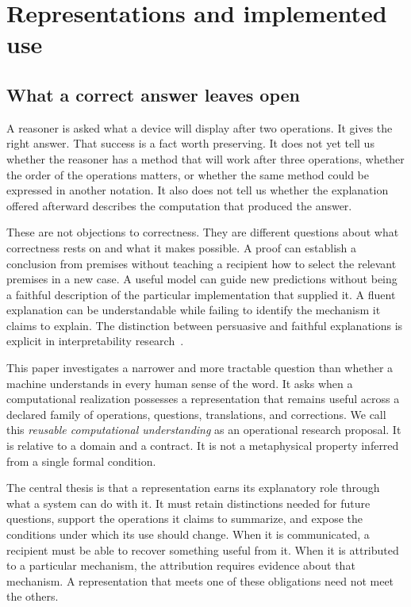 
\chapter{Representations and implemented use}\label{MU:book:chapter-46}


\section{What a correct answer leaves open}\label{MU:sec:intro}
A reasoner is asked what a device will display after two operations. It gives the right answer. That success is a fact worth preserving. It does not yet tell us whether the reasoner has a method that will work after three operations, whether the order of the operations matters, or whether the same method could be expressed in another notation. It also does not tell us whether the explanation offered afterward describes the computation that produced the answer.

These are not objections to correctness. They are different questions about what correctness rests on and what it makes possible. A proof can establish a conclusion from premises without teaching a recipient how to select the relevant premises in a new case. A useful model can guide new predictions without being a faithful description of the particular implementation that supplied it. A fluent explanation can be understandable while failing to identify the mechanism it claims to explain. The distinction between persuasive and faithful explanations is explicit in interpretability research~\cite{MU:jacovi}.

This paper investigates a narrower and more tractable question than whether a machine understands in every human sense of the word. It asks when a computational realization possesses a representation that remains useful across a declared family of operations, questions, translations, and corrections. We call this \emph{reusable computational understanding} as an operational research proposal. It is relative to a domain and a contract. It is not a metaphysical property inferred from a single formal condition.

The central thesis is that a representation earns its explanatory role through what a system can do with it. It must retain distinctions needed for future questions, support the operations it claims to summarize, and expose the conditions under which its use should change. When it is communicated, a recipient must be able to recover something useful from it. When it is attributed to a particular mechanism, the attribution requires evidence about that mechanism. A representation that meets one of these obligations need not meet the others.

